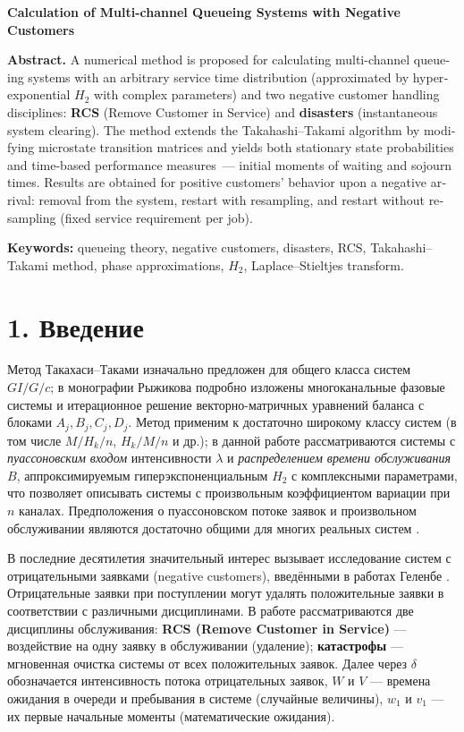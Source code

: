 \begin{otherlanguage}{english}
\bigskip
\begin{center}
\textbf{Calculation of Multi-channel Queueing Systems with Negative Customers}
\end{center}
\smallskip

\textbf{Abstract.} A numerical method is proposed for calculating multi-channel queueing systems with an arbitrary service time distribution (approximated by hyperexponential \(H_2\) with complex parameters) and two negative customer handling disciplines: \textbf{RCS} (Remove Customer in Service) and \textbf{disasters} (instantaneous system clearing). The method extends the Takahashi--Takami algorithm by modifying microstate transition matrices and yields both stationary state probabilities and time-based performance measures~--- initial moments of waiting and sojourn times. Results are obtained for positive customers' behavior upon a negative arrival: removal from the system, restart with resampling, and restart without resampling (fixed service requirement per job).

\textbf{Keywords:} queueing theory, negative customers, disasters, RCS, Takahashi--Takami method, phase approximations, \(H_2\), Laplace--Stieltjes transform.
\end{otherlanguage}





\section*{1. Введение}
Метод Такахаси--Таками \cite{takahashi1976} изначально предложен для общего класса систем \(GI/G/c\); в монографии Рыжикова \cite{ryzhikov2018ru} подробно изложены многоканальные фазовые системы и итерационное 
решение векторно-матричных уравнений баланса с блоками \(A_j,B_j,C_j,D_j\). Метод применим к достаточно широкому классу систем (в том числе \(M/H_k/n\), \(H_k/M/n\) и др.); 
в данной работе рассматриваются системы с \emph{пуассоновским входом} интенсивности \(\lambda\) и \emph{распределением времени обслуживания} \(B\), аппроксимируемым гиперэкспоненциальным \(H_2\) с комплексными параметрами, 
что позволяет описывать системы с произвольным коэффициентом вариации при \(n\) каналах. Предположения о пуассоновском потоке заявок и произвольном обслуживании являются достаточно общими для многих реальных систем \cite{kleinrock1979ru,bocharov2004ru}.

В последние десятилетия значительный интерес вызывает исследование систем с отрицательными заявками (negative customers), введёнными в работах Геленбе \cite{gelenbe1991,gelenbe1992}. 
Отрицательные заявки при поступлении могут удалять положительные заявки в соответствии с различными дисциплинами. В работе рассматриваются две дисциплины обслуживания: \textbf{RCS (Remove Customer in Service)} --- воздействие на одну заявку в обслуживании (удаление); \textbf{катастрофы} --- мгновенная очистка системы от всех положительных заявок. 
Далее через \(\delta\) обозначается интенсивность потока отрицательных заявок, \(W\) и \(V\) --- времена ожидания в очереди и пребывания в системе (случайные величины), \(w_1\) и \(v_1\) --- их первые начальные моменты (математические ожидания).

